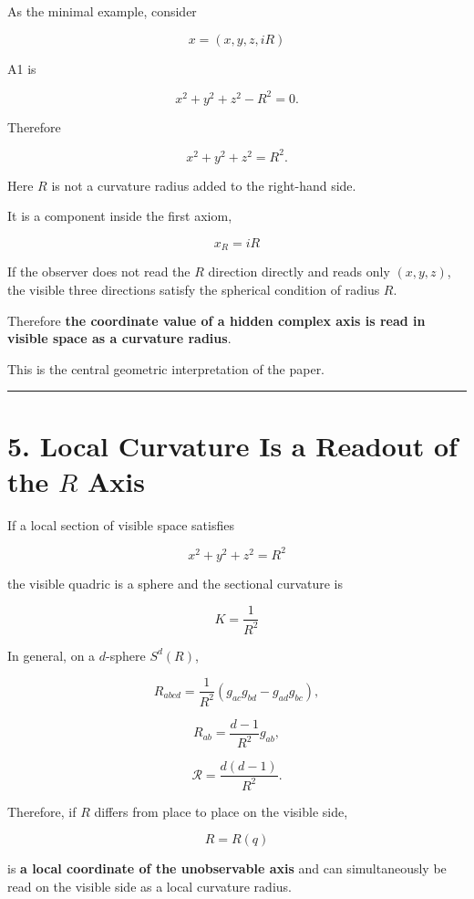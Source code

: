 \documentclass[
  a4paper,
]{article}
\begin{document}
As the minimal example, consider

\[
x=(x,y,z,iR)
\]

A1 is

\[
x^2+y^2+z^2-R^2=0.
\]

Therefore

\[
\boxed{
x^2+y^2+z^2=R^2
}.
\]

Here \(R\) is not a curvature radius added to the right-hand side.

It is a component inside the first axiom,

\[
\boxed{
x_R=iR
}
\]

If the observer does not read the \(R\) direction directly and reads
only \((x,y,z)\), the visible three directions satisfy the spherical
condition of radius \(R\).

Therefore \textbf{the coordinate value of a hidden complex axis is read
in visible space as a curvature radius}.

This is the central geometric interpretation of the paper.

\begin{center}\rule{0.5\linewidth}{0.5pt}\end{center}

\section{\texorpdfstring{5. Local Curvature Is a Readout of the \(R\)
Axis}{5. Local Curvature Is a Readout of the R Axis}}\label{local-curvature-is-a-readout-of-the-r-axis}

If a local section of visible space satisfies

\[
x^2+y^2+z^2=R^2
\]

the visible quadric is a sphere and the sectional curvature is

\[
\boxed{
K=\frac{1}{R^2}
}
\]

In general, on a \(d\)-sphere \(S^d(R)\),

\[
R_{abcd}
=
\frac1{R^2}
(g_{ac}g_{bd}-g_{ad}g_{bc}),
\]

\[
R_{ab}
=
\frac{d-1}{R^2}g_{ab},
\]

\[
\boxed{
\mathcal R
=
\frac{d(d-1)}{R^2}
}.
\]

Therefore, if \(R\) differs from place to place on the visible side,

\[
R=R(q)
\]

is \textbf{a local coordinate of the unobservable axis} and can
simultaneously be read on the visible side as a local curvature radius.
\end{document}
